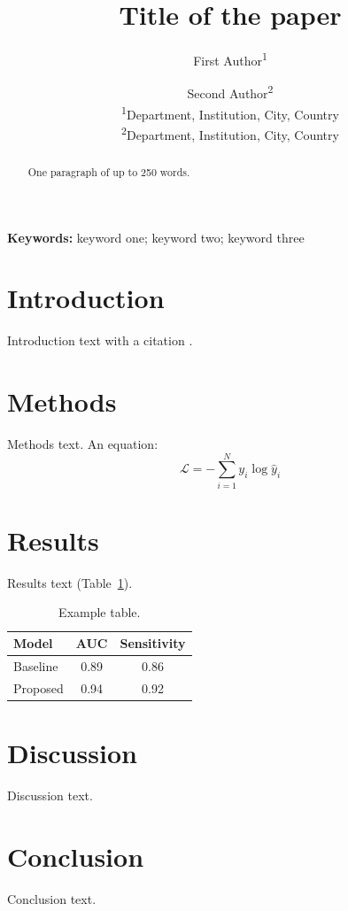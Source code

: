 \documentclass[10pt,twocolumn]{article}
\title{Title of the paper}
\author{First Author\textsuperscript{1} \and Second Author\textsuperscript{2}\\
\small\textsuperscript{1}Department, Institution, City, Country\\
\small\textsuperscript{2}Department, Institution, City, Country}
\date{}
\begin{document}
\maketitle

\begin{abstract}
One paragraph of up to 250 words.
\end{abstract}

\noindent\textbf{Keywords:} keyword one; keyword two; keyword three

\section{Introduction}
Introduction text with a citation \citep{example2024}.

\section{Methods}
Methods text. An equation:
\begin{equation}
\mathcal{L} = -\sum_{i=1}^{N} y_i \log \hat{y}_i
\label{eq:loss}
\end{equation}

\section{Results}
Results text (Table~\ref{tab:example}).
\begin{table}[t]
\centering
\caption{Example table.}
\label{tab:example}
\begin{tabular}{lcc}
\toprule
Model & AUC & Sensitivity \\
\midrule
Baseline & 0.89 & 0.86 \\
Proposed & 0.94 & 0.92 \\
\bottomrule
\end{tabular}
\end{table}

\section{Discussion}
Discussion text.

\section{Conclusion}
Conclusion text.



\end{document}
